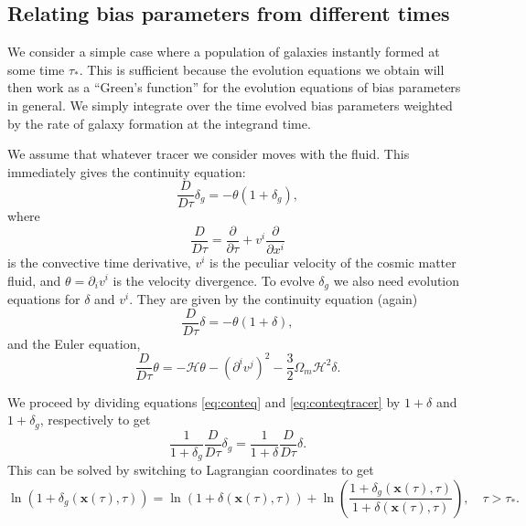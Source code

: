\documentclass[11pt]{article}
\begin{document}
\subsection{Relating bias parameters from different times}
We consider a simple case where a population of galaxies instantly formed at some time $\tau_*$. This is sufficient because the evolution equations we obtain will then work as a ``Green's function'' for the evolution equations of bias parameters in general. We simply integrate over the time evolved bias parameters weighted by the rate of galaxy formation at the integrand time.

We assume that whatever tracer we consider moves with the fluid. This immediately gives the continuity equation:
\begin{equation}
    \frac{D}{D\tau}\delta_g = -\theta(1+\delta_g),
    \label{eq:conteqtracer}
\end{equation}
where
\begin{equation}
    \frac{D}{D\tau} = \frac{\partial}{\partial \tau} + v^i\frac{\partial}{\partial x^i}
\end{equation}
is the convective time derivative, $v^i$ is the peculiar velocity of the cosmic matter fluid, and $\theta=\partial_i v^i$ is the velocity divergence. %
To evolve $\delta_g$ we also need evolution equations for $\delta$ and $v^i$. They are given by the continuity equation (again)
\begin{equation}
    \frac{D}{D\tau}\delta = -\theta(1+\delta),
    \label{eq:conteq}
\end{equation}
and the Euler equation,
\begin{equation}
    \frac{D}{D\tau}\theta = -\mathcal H \theta - (\partial^iv^j)^2 - \frac{3}{2}\Omega_m\mathcal H^2\delta.
\end{equation}

We proceed by dividing equations \ref{eq:conteq} and \ref{eq:conteqtracer} by $1+\delta$ and $1+\delta_g$, respectively to get
\begin{equation}
    \frac{1}{1+\delta_g}\frac{D}{D\tau}\delta_g = \frac{1}{1+\delta}\frac{D}{D\tau}\delta.
\end{equation}
This can be solved by switching to Lagrangian coordinates to get
\begin{equation}
    \ln (1+\delta_g(\mathbf x (\tau), \tau)) = \ln (1+\delta(\mathbf x (\tau), \tau)) + \ln (\frac{1+\delta_g(\mathbf x (\tau), \tau)}{1+\delta(\mathbf x(\tau), \tau)}), \quad \tau>\tau_*.
\end{equation}
\end{document}
